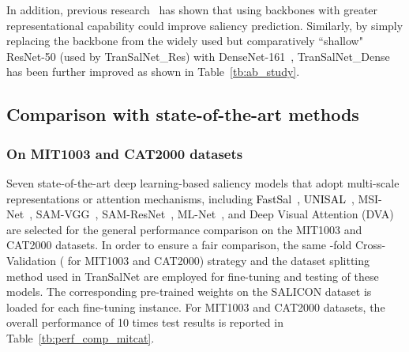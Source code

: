 \documentclass{article}
\begin{document}
In addition, previous research~\cite{EML-NET, DP2E} has shown that using backbones with greater representational capability could improve saliency prediction. Similarly, by simply replacing the backbone from the widely used but comparatively ``shallow" ResNet-50 (used by TranSalNet\_Res) with DenseNet-161~\cite{DenseNet}, TranSalNet\_Dense has been further improved as shown in Table~\ref{tb:ab_study}.








\subsection{Comparison with state-of-the-art methods} 
\subsubsection{On MIT1003 and CAT2000 datasets} 

Seven state-of-the-art deep learning-based saliency models that adopt multi-scale representations or attention mechanisms, including \textcolor{black}{FastSal~\cite{FastSal}, UNISAL~\cite{UNISAL}}, MSI-Net~\cite{MSI-Net}, SAM-VGG~\cite{SAM_Cornia}, SAM-ResNet~\cite{SAM_Cornia}, ML-Net~\cite{ML-Net}, and Deep Visual Attention (DVA)~\cite{DVA_Wang} are selected for the general performance comparison on the MIT1003 and CAT2000 datasets. In order to ensure a fair comparison, the same -fold Cross-Validation ( for MIT1003 and CAT2000) strategy and the dataset splitting method used in TranSalNet are employed for fine-tuning and testing of these models. The corresponding pre-trained weights on the SALICON dataset is loaded for each fine-tuning instance. For MIT1003 and CAT2000 datasets, the overall performance of 10 times test results is reported in Table~\ref{tb:perf_comp_mitcat}.
\end{document}
